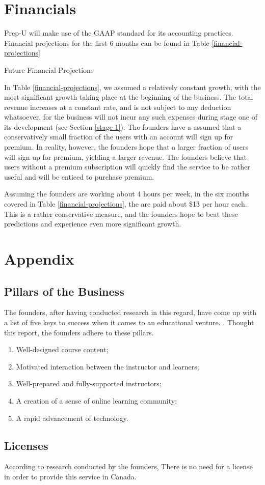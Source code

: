 \documentclass{business}
\begin{document}
    \section{Financials}
    Prep-U will make use of the GAAP standard for its accounting practices. Financial projections for the first 6 months can be found in Table \ref{financial-projections}\par
    \begin{table}[H]
        \caption{Future Financial Projections}
        \label{financial-projections}
    \end{table}
    In Table \ref{financial-projections}, we assumed a relatively constant growth, with the most significant growth taking place at the beginning of the business. The total revenue increases at a constant rate, and is not subject to any deduction whatsoever, for the business will not incur any such expenses during stage one of its development (see Section \ref{stage-1}). The founders have a assumed that a conservatively small fraction of the users with an account will sign up for premium. In reality, however, the founders hope that a larger fraction of users will sign up for premium, yielding a larger revenue. The founders believe that users without a premium subscription will quickly find the service to be rather useful and will be enticed to purchase premium.\par
    Assuming the founders are working about 4 hours per week, in the six months covered in Table \ref{financial-projections}, the are paid about \$13 per hour each. This is a rather conservative measure, and the founders hope to beat these predictions and experience even more significant growth.
    \section{Appendix}
    \subsection{Pillars of the Business}\label{pillars}
    The founders, after having conducted research in this regard, have come up with a list of five keys to success when it comes to an educational venture. \cite{Sun2016}. Thought this report, the founders adhere to these pillars. \par
    \begin{enumerate}
        \renewcommand{\theenumi}{(\Roman{enumi})}
        \item Well-designed course content;
        \item Motivated interaction between the instructor and learners;
        \item Well-prepared and fully-supported instructors;
        \item A creation of a sense of online learning community; 
        \item A rapid advancement of technology.
    \end{enumerate}
    \subsection{Licenses}
    According to research conducted by the founders, There is no need for a license in order to provide this service in Canada.
    \newpage
    
    
\end{document}
